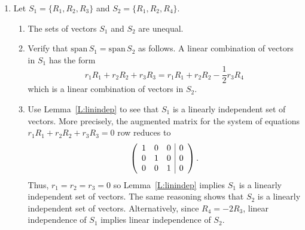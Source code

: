 \documentclass{ximera}
\begin{document}
\begin{exercise}
\begin{solution}
\begin{enumerate}
\item Let $S_1=\{R_1,R_2,R_3\}$ and $S_2=\{R_1,R_2,R_4\}$.   
\begin{enumerate}
	\item The sets of vectors $S_1$ and $S_2$ are unequal.
	\item Verify that $\mathrm{span}\,S_1 = \mathrm{span}\,S_2$ as follows.  A linear combination of vectors in $S_1$ has the form
	\[
	r_1 R_1 + r_2 R_2 + r_3 R_3 = r_1 R_1 + r_2 R_2 - \frac{1}{2} r_3 R_4 
	\]
	which is a linear combination of vectors in $S_2$. 
	\item Use  Lemma~\ref{L:linindep} to see that $S_1$ is a linearly independent set of vectors. More precisely, the augmented matrix for the system of equations $r_1R_1+r_2 R_2+r_3 R_3=0$ row reduces to 
\[
\left(
\begin{array}{ccc|c}
 1 & 0 & 0 & 0 \\
 0 & 1 & 0& 0 \\
 0 & 0 & 1& 0 \\
\end{array}
\right)\ldotp
\]
Thus, $r_1 = r_2 = r_3 = 0$ so Lemma~\ref{L:linindep} implies $S_1$ is a linearly independent set of vectors. The same reasoning shows that $S_2$ is a linearly independent set of vectors.  Alternatively, since $R_4=-2R_3$, linear independence of $S_1$ implies linear independence of $S_2$.
\end{enumerate}
\end{enumerate}
\end{solution}
\end{exercise}
\end{document}
